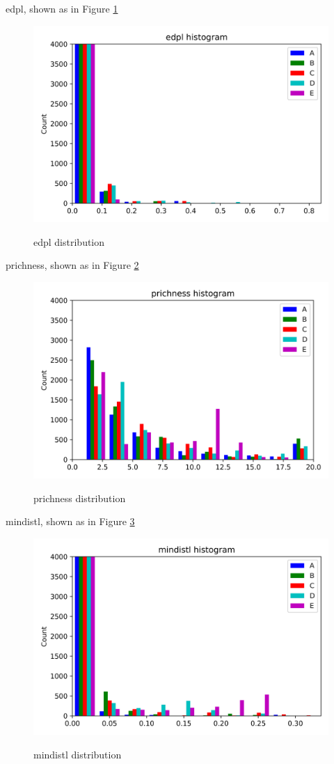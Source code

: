 \documentclass{article}
\begin{document}
edpl, shown as in Figure \ref{edpl-community}
\begin{figure}[htbp]
	\centering
	\includegraphics[width=\textwidth, keepaspectratio]{edpl-community.png}\\
	\caption{edpl distribution}
	\label{edpl-community}
\end{figure}


prichness, shown as in Figure \ref{prichness-community}
\begin{figure}[htbp]
	\centering
	\includegraphics[width=\textwidth, keepaspectratio]{prichness-community.png}\\
	\caption{prichness distribution}
	\label{prichness-community}
\end{figure}


mindistl, shown as in Figure \ref{mindistl-community}
\begin{figure}[htbp]
	\centering
	\includegraphics[width=\textwidth, keepaspectratio]{mindistl-community.png}\\
	\caption{mindistl distribution}
	\label{mindistl-community}
\end{figure}
\end{document}
